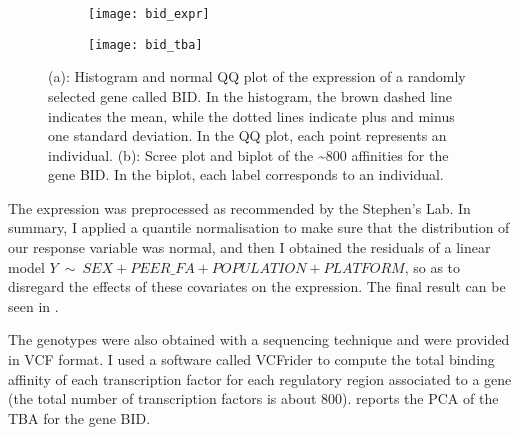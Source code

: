 \begin{figure}[H]
  \begin{subfigure}{\textwidth}
    \centering
    \caption{}
    \texttt{[image: bid\_expr]}
  \end{subfigure}

  \begin{subfigure}{\textwidth}
    \centering
    \caption{}
    \texttt{[image: bid\_tba]}
  \end{subfigure}
  \caption{(a): Histogram and normal QQ plot of the 
expression of a randomly selected gene called BID. In the histogram, the 
brown dashed line indicates the mean, while the dotted lines indicate 
plus and minus one standard deviation. In the QQ 
plot, each point represents an individual. (b): Scree plot and biplot of 
the \textasciitilde800 affinities for the gene BID. In the biplot, each 
label corresponds to an individual.}
\end{figure}

The expression was preprocessed as recommended by the Stephen's 
Lab. 
In summary, I applied a quantile normalisation to make sure that the 
distribution of our response variable was normal, and then I obtained 
the residuals of a linear model 
$Y~\sim~SEX+PEER\_FA+POPULATION+PLATFORM$, so as to disregard the 
effects of these covariates on the expression. The final result can be 
seen in .

The genotypes were also obtained with a sequencing technique and were 
provided in VCF format.  I 
used a software called 
\nohyphens{VCF\textunderscore\nobreak\hspace{0pt}rider} 
to compute the total binding affinity of each transcription factor for 
each regulatory region associated to a gene (the total number of 
transcription factors is about 800).  reports the PCA of 
the TBA for the gene BID.
